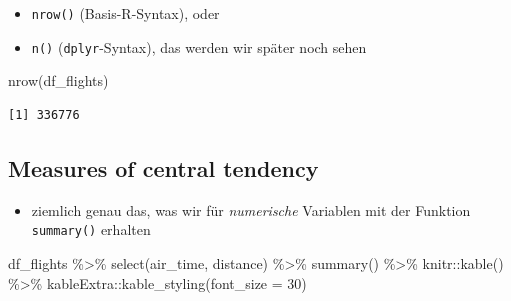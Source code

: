 \documentclass[
  letterpaper,
  DIV=11]{scrartcl}
\newenvironment{Shaded}{\begin{snugshade}}{\end{snugshade}}
\newcommand{\AttributeTok}[1]{\textcolor[rgb]{0.40,0.45,0.13}{#1}}
\newcommand{\DecValTok}[1]{\textcolor[rgb]{0.68,0.00,0.00}{#1}}
\newcommand{\FunctionTok}[1]{\textcolor[rgb]{0.28,0.35,0.67}{#1}}
\newcommand{\NormalTok}[1]{\textcolor[rgb]{0.00,0.23,0.31}{#1}}
\newcommand{\SpecialCharTok}[1]{\textcolor[rgb]{0.37,0.37,0.37}{#1}}
\providecommand{\tightlist}{%
  \setlength{\itemsep}{0pt}\setlength{\parskip}{0pt}}\usepackage{longtable,booktabs,array}
\begin{document}
\begin{tcolorbox}
\begin{itemize}
  \begin{itemize}
  \tightlist
  \item
    \texttt{nrow()} (Basis-R-Syntax), oder
  \item
    \texttt{n()} (\texttt{dplyr}-Syntax), das werden wir später noch
    sehen
  \end{itemize}
\end{itemize}

\begin{Shaded}
\begin{Highlighting}[]
\FunctionTok{nrow}\NormalTok{(df\_flights)}
\end{Highlighting}
\end{Shaded}

\begin{verbatim}
[1] 336776
\end{verbatim}

\end{tcolorbox}

\hypertarget{measures-of-central-tendency}{%
\subsection{Measures of central
tendency}\label{measures-of-central-tendency}}

\begin{itemize}
\tightlist
\item
  ziemlich genau das, was wir für \emph{numerische} Variablen mit der
  Funktion \texttt{summary()} erhalten
\end{itemize}

\begin{Shaded}
\begin{Highlighting}[]
\NormalTok{df\_flights }\SpecialCharTok{\%\textgreater{}\%} 
  \FunctionTok{select}\NormalTok{(air\_time, distance) }\SpecialCharTok{\%\textgreater{}\%} 
  \FunctionTok{summary}\NormalTok{() }\SpecialCharTok{\%\textgreater{}\%} 
\NormalTok{  knitr}\SpecialCharTok{::}\FunctionTok{kable}\NormalTok{() }\SpecialCharTok{\%\textgreater{}\%} 
\NormalTok{  kableExtra}\SpecialCharTok{::}\FunctionTok{kable\_styling}\NormalTok{(}\AttributeTok{font\_size =} \DecValTok{30}\NormalTok{)}
\end{Highlighting}
\end{Shaded}
\end{document}
